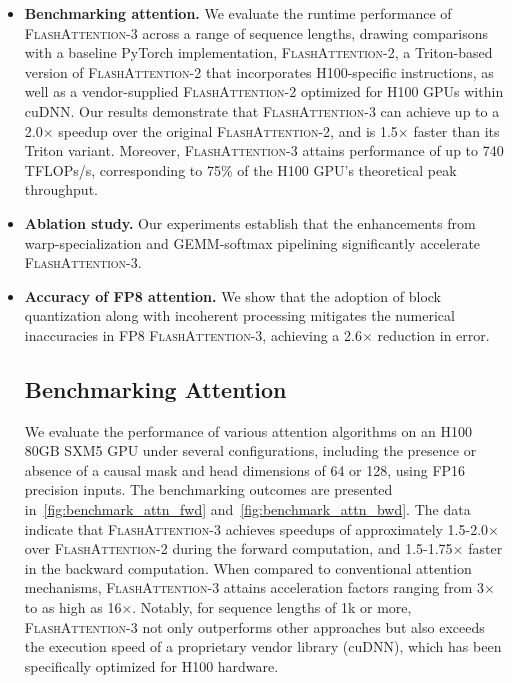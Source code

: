 \begin{itemize}

\item \textbf{Benchmarking attention.} We evaluate the runtime performance of \textsc{FlashAttention-3} across a range of sequence lengths, drawing comparisons with a baseline PyTorch implementation, \textsc{FlashAttention-2}, a Triton-based version of \textsc{FlashAttention-2} that incorporates H100-specific instructions, as well as a vendor-supplied \textsc{FlashAttention-2} optimized for H100 GPUs within cuDNN. Our results demonstrate that \textsc{FlashAttention-3} can achieve up to a 2.0$\times$ speedup over the original \textsc{FlashAttention-2}, and is 1.5$\times$ faster than its Triton variant. Moreover, \textsc{FlashAttention-3} attains performance of up to 740 TFLOPs/s, corresponding to 75\% of the H100 GPU's theoretical peak throughput.
\item \textbf{Ablation study.} Our experiments establish that the enhancements from warp-specialization and GEMM-softmax pipelining significantly accelerate \textsc{FlashAttention-3}.
\item \textbf{Accuracy of FP8 attention.} We show that the adoption of block quantization along with incoherent processing mitigates the numerical inaccuracies in FP8 \textsc{FlashAttention-3}, achieving a 2.6$\times$ reduction in error.

\subsection{Benchmarking Attention}
\label{subsec:benchmark_attn}

We evaluate the performance of various attention algorithms on an H100 80GB SXM5 GPU under several configurations, including the presence or absence of a causal mask and head dimensions of 64 or 128, using FP16 precision inputs. The benchmarking outcomes are presented in~\cref{fig:benchmark_attn_fwd} and~\cref{fig:benchmark_attn_bwd}. The data indicate that \textsc{FlashAttention-3} achieves speedups of approximately 1.5-2.0$\times$ over \textsc{FlashAttention-2} during the forward computation, and 1.5-1.75$\times$ faster in the backward computation. When compared to conventional attention mechanisms, \textsc{FlashAttention-3} attains acceleration factors ranging from 3$\times$ to as high as 16$\times$. Notably, for sequence lengths of 1k or more, \textsc{FlashAttention-3} not only outperforms other approaches but also exceeds the execution speed of a proprietary vendor library (cuDNN), which has been specifically optimized for H100 hardware.


\end{itemize}
